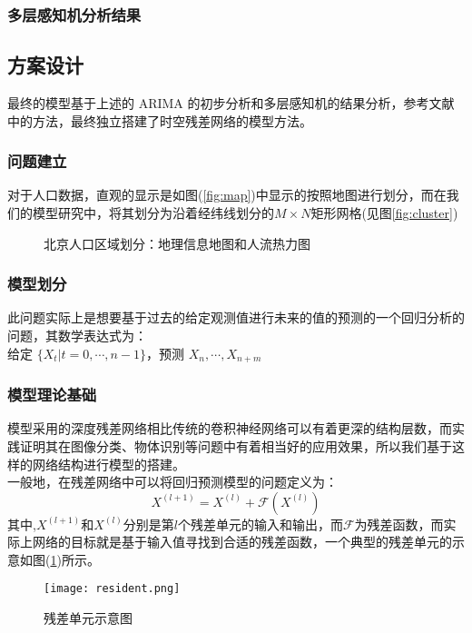 \subsubsection*{多层感知机分析结果}

\subsection{方案设计}
最终的模型基于上述的 ARIMA 的初步分析和多层感知机的结果分析，参考文献中的方法，最终独立搭建了时空残差网络的模型方法。
\subsubsection*{问题建立}
对于人口数据，直观的显示是如图(\ref{fig:map})中显示的按照地图进行划分，而在我们的模型研究中，将其划分为沿着经纬线划分的$M \times N$矩形网格(见图\ref{fig:cluster})
\begin{figure}[ht]
\centering
{}
\hfill
\caption{北京人口区域划分：地理信息地图和人流热力图}
\end{figure}
\subsubsection*{模型划分}
此问题实际上是想要基于过去的给定观测值进行未来的值的预测的一个回归分析的问题，其数学表达式为：
\\
给定 $\{X_t | t = 0,\cdots,n-1 \}$，预测 $X_{n},\cdots,X_{n+m}$
\subsubsection*{模型理论基础}
模型采用的深度残差网络相比传统的卷积神经网络可以有着更深的结构层数\cite{he2016deep}，而实践证明其在图像分类、物体识别等问题中有着相当好的应用效果\cite{he2016identity}，所以我们基于这样的网络结构进行模型的搭建。\\
一般地，在残差网络中可以将回归预测模型的问题定义为：
\begin{equation}
X^{(l+1)} = X^{(l)} + \mathcal{F}(X^{(l)})
\end{equation}
其中,$X^{(l+1)}$和$X^{(l)}$分别是第$l$个残差单元的输入和输出，而$\mathcal{F}$为残差函数，而实际上网络的目标就是基于输入值寻找到合适的残差函数，一个典型的残差单元的示意如图(\ref{fig:resident})所示。
\begin{figure}[ht]
\centering
\texttt{[image: resident.png]}
\caption{残差单元示意图\cite{he2016deep}}
\label{fig:resident}
\end{figure}
